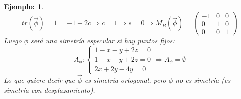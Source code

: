 \documentclass[10pt,a4paper,openright]{book}
\theoremstyle{break}
\newtheorem*{ej}{\underline{Ejemplo}:}
\begin{document}
\begin{ej}
$$tr(\vec{\phi}) = 1 = -1+2c\Rightarrow c = 1 \Rightarrow s = 0 \Rightarrow  M_B(\vec{\phi})=\begin{pmatrix} -1 & 0 & 0 \\ 0 & 1 & 0 \\ 0 & 0 & 1\end{pmatrix}$$
Luego $\phi$ será una simetría especular si hay puntos fijos:
$$A_\phi : \begin{cases} 1 - x - y + 2z = 0 \\ 1-x-y+2z = 0 \\ 2x + 2y - 4y = 0 \end{cases} \Rightarrow A_\phi = \emptyset$$
Lo que quiere decir que $\vec{\phi}$ es simetría ortogonal, pero $\phi$ no es simetría (es simetría con desplazamiento).
\end{ej}

\theoremstyle{break}
	\theoremheaderfont{\normalfont\bfseries\color{teoremas}}
	\theorembodyfont{\itshape}
	\theoremseparator{\vspace{0.2cm}}
	\theorempreskip{\topsep}
	\theorempostskip{\topsep}
	\theoremsymbol{}
	\theoremprework{\vspace{0.2cm}}
	\theorempostwork{\vspace{0.2cm}}
\end{document}
